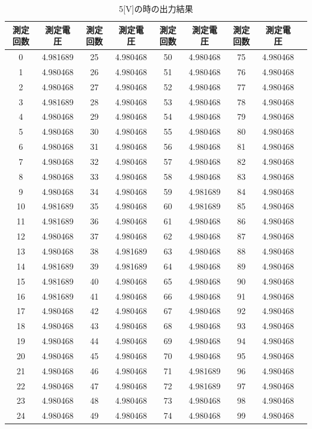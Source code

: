 \documentclass[11pt,dvipdfmx]{jarticle}
\begin{document}
			\begin{table}[b]
				\centering
				\caption{5[V]の時の出力結果}
				\label{tab:5}
				\begin{tabular}{|c|c|c|c|c|c|c|c|c|}
					\hline
					測定回数&測定電圧&測定回数&測定電圧&測定回数&測定電圧&測定回数&測定電圧\\
					\hline
				0  & 4.981689 & 25 & 4.980468 & 50 & 4.980468 & 75 & 4.980468 \\
				1  & 4.980468 & 26 & 4.980468 & 51 & 4.980468 & 76 & 4.980468 \\
				2  & 4.980468 & 27 & 4.980468 & 52 & 4.980468 & 77 & 4.980468 \\
				3  & 4.981689 & 28 & 4.980468 & 53 & 4.980468 & 78 & 4.980468 \\
				4  & 4.980468 & 29 & 4.980468 & 54 & 4.980468 & 79 & 4.980468 \\
				5  & 4.980468 & 30 & 4.980468 & 55 & 4.980468 & 80 & 4.980468 \\
				6  & 4.980468 & 31 & 4.980468 & 56 & 4.980468 & 81 & 4.980468 \\
				7  & 4.980468 & 32 & 4.980468 & 57 & 4.980468 & 82 & 4.980468 \\
				8  & 4.980468 & 33 & 4.980468 & 58 & 4.980468 & 83 & 4.980468 \\
				9  & 4.980468 & 34 & 4.980468 & 59 & 4.981689 & 84 & 4.980468 \\
				10 & 4.981689 & 35 & 4.980468 & 60 & 4.981689 & 85 & 4.980468 \\
				11 & 4.981689 & 36 & 4.980468 & 61 & 4.980468 & 86 & 4.980468 \\
				12 & 4.980468 & 37 & 4.980468 & 62 & 4.980468 & 87 & 4.980468 \\
				13 & 4.980468 & 38 & 4.981689 & 63 & 4.980468 & 88 & 4.980468 \\
				14 & 4.981689 & 39 & 4.981689 & 64 & 4.980468 & 89 & 4.980468 \\
				15 & 4.981689 & 40 & 4.980468 & 65 & 4.980468 & 90 & 4.980468 \\
				16 & 4.981689 & 41 & 4.980468 & 66 & 4.980468 & 91 & 4.980468 \\
				17 & 4.980468 & 42 & 4.980468 & 67 & 4.980468 & 92 & 4.980468 \\
				18 & 4.980468 & 43 & 4.980468 & 68 & 4.980468 & 93 & 4.980468 \\
				19 & 4.980468 & 44 & 4.980468 & 69 & 4.980468 & 94 & 4.980468 \\
				20 & 4.980468 & 45 & 4.980468 & 70 & 4.980468 & 95 & 4.980468 \\
				21 & 4.980468 & 46 & 4.980468 & 71 & 4.981689 & 96 & 4.980468 \\
				22 & 4.980468 & 47 & 4.980468 & 72 & 4.981689 & 97 & 4.980468 \\
				23 & 4.980468 & 48 & 4.980468 & 73 & 4.980468 & 98 & 4.980468 \\
				24 & 4.980468 & 49 & 4.980468 & 74 & 4.980468 & 99 & 4.980468\\
				\hline
				\end{tabular}
			\end{table}
\end{document}
